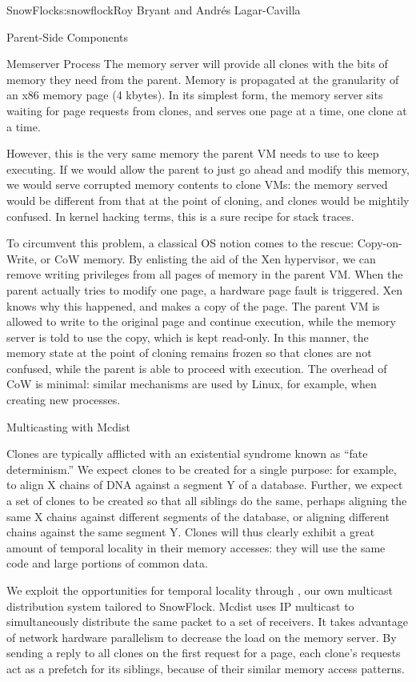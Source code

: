 \begin{aosachapter}{SnowFlock}{s:snowflock}{Roy Bryant and Andr\'e{s} Lagar-Cavilla}
\begin{aosasect1}{Parent-Side Components}
\begin{aosasect2}{Memserver Process}
The memory server will provide all clones with the bits of memory they
need from the parent. Memory is propagated at the granularity of an
x86 memory page (4 kbytes). In its simplest form, the memory server sits
waiting for page requests from clones, and serves one page at a time,
one clone at a time.

However, this is the very same memory the parent VM needs to use to
keep executing. If we would allow the parent to just go ahead and
modify this memory, we would serve corrupted memory contents to clone
VMs: the memory served would be different from that at the point of
cloning, and clones would be mightily confused. In kernel hacking
terms, this is a sure recipe for stack traces.

To circumvent this problem, a classical OS notion comes to the rescue:
Copy-on-Write, or CoW memory. By enlisting the aid of the Xen
hypervisor, we can remove writing privileges from all pages of memory
in the parent VM\@. When the parent actually tries to modify one page, a
hardware page fault is triggered.  Xen knows why this happened, and
makes a copy of the page. The parent VM is allowed to write to the original
page and continue execution, while the memory server is told to use
the copy, which is kept read-only. In this manner, the memory state at the point of cloning
remains frozen so that clones are not confused, while the parent is
able to proceed with execution. The overhead of CoW is minimal:
similar mechanisms are used by Linux, for example, when creating new
processes.

\end{aosasect2}

\begin{aosasect2}{Multicasting with Mcdist}

Clones are typically afflicted with an existential syndrome known as
``fate determinism.'' We expect clones to be created for a single
purpose: for example, to align X chains of DNA against a segment Y of
a database. Further, we expect a set of clones to be created so that
all siblings do the same, perhaps aligning the same X chains against
different segments of the database, or aligning different chains
against the same segment Y\@. Clones will thus clearly exhibit a great
amount of temporal locality in their memory accesses: they will use
the same code and large portions of common data.

We exploit the opportunities for temporal locality through , our
own multicast distribution system tailored to SnowFlock. Mcdist uses
IP multicast to simultaneously distribute the same packet to a set of
receivers. It takes advantage of network hardware parallelism to
decrease the load on the memory server. By sending a reply to all
clones on the first request for a page, each clone's requests act as a
prefetch for its siblings, because of their similar memory access
patterns.


\end{aosasect2}
\end{aosasect1}
\end{aosachapter}
